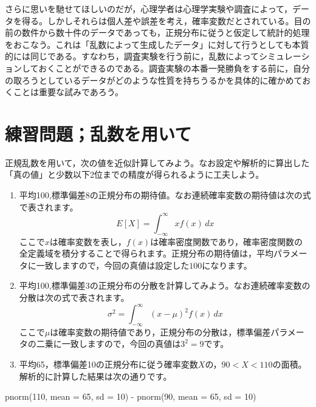 \documentclass[
  a4paper,
]{ltjsbook}
\newenvironment{Shaded}{\begin{snugshade}}{\end{snugshade}}
\newcommand{\AttributeTok}[1]{\textcolor[rgb]{0.40,0.45,0.13}{#1}}
\newcommand{\DecValTok}[1]{\textcolor[rgb]{0.68,0.00,0.00}{#1}}
\newcommand{\FunctionTok}[1]{\textcolor[rgb]{0.28,0.35,0.67}{#1}}
\newcommand{\NormalTok}[1]{\textcolor[rgb]{0.00,0.23,0.31}{#1}}
\newcommand{\SpecialCharTok}[1]{\textcolor[rgb]{0.37,0.37,0.37}{#1}}
\providecommand{\tightlist}{%
  \setlength{\itemsep}{0pt}\setlength{\parskip}{0pt}}
\begin{document}
さらに思いを馳せてほしいのだが，心理学者は心理学実験や調査によって，データを得る。しかしそれらは個人差や誤差を考え，確率変数だとされている。目の前の数件から数十件のデータであっても，正規分布に従うと仮定して統計的処理をおこなう。これは「乱数によって生成したデータ」に対して行うとしても本質的には同じである。すなわち，調査実験を行う前に，乱数によってシミュレーションしておくことができるのである。調査実験の本番一発勝負をする前に，自分の取ろうとしているデータがどのような性質を持ちうるかを具体的に確かめておくことは重要な試みであろう。

\section{練習問題；乱数を用いて}\label{ux7df4ux7fd2ux554fux984cux4e71ux6570ux3092ux7528ux3044ux3066}

正規乱数を用いて，次の値を近似計算してみよう。なお設定や解析的に算出した「真の値」と少数以下2位までの精度が得られるように工夫しよう。

\begin{enumerate}
\def\labelenumi{\arabic{enumi}.}
\tightlist
\item
  平均100,標準偏差8の正規分布の期待値。なお連続確率変数の期待値は次の式で表されます。\[E[X] = \int_{-\infty}^{\infty} x f(x) \, dx\]
  ここで\(x\)は確率変数を表し，\(f(x)\)は確率密度関数であり，確率密度関数の全定義域を積分することで得られます。正規分布の期待値は，平均パラメータに一致しますので，今回の真値は設定した\(100\)になります。
\item
  平均100,標準偏差3の正規分布の分散を計算してみよう。なお連続確率変数の分散は次の式で表されます。\[\sigma^2 = \int_{-\infty}^{\infty} (x - \mu)^2 f(x) \, dx\]
  ここで\(\mu\)は確率変数の期待値であり，正規分布の分散は，標準偏差パラメータの二乗に一致しますので，今回の真値は\(3^2 = 9\)です。
\item
  平均65，標準偏差10の正規分布に従う確率変数\(X\)の，\(90 < X < 110\)の面積。解析的に計算した結果は次の通りです。
\end{enumerate}

\begin{Shaded}
\begin{Highlighting}[]
\FunctionTok{pnorm}\NormalTok{(}\DecValTok{110}\NormalTok{, }\AttributeTok{mean =} \DecValTok{65}\NormalTok{, }\AttributeTok{sd =} \DecValTok{10}\NormalTok{) }\SpecialCharTok{{-}} \FunctionTok{pnorm}\NormalTok{(}\DecValTok{90}\NormalTok{, }\AttributeTok{mean =} \DecValTok{65}\NormalTok{, }\AttributeTok{sd =} \DecValTok{10}\NormalTok{)}
\end{Highlighting}
\end{Shaded}
\end{document}
